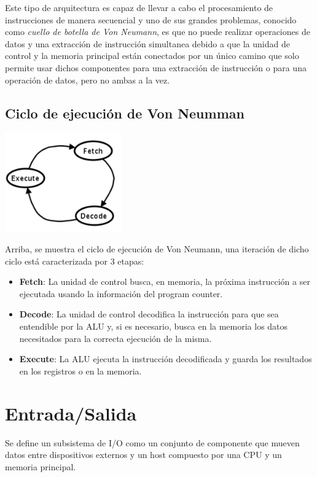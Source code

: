 Este tipo de arquitectura es capaz de llevar a cabo el procesamiento de instrucciones de manera secuencial y uno de sus grandes problemas, conocido como \textit{cuello de botella de Von Neumann}, es que no puede realizar operaciones de datos y una extracción de instrucción simultanea debido a que la unidad de control y la memoria principal están conectados por un único camino que solo permite usar dichos componentes para una extracción de instrucción o para una operación de datos, pero no ambas a la vez.

\subsection{Ciclo de ejecución de Von Neumman}
\begin{center}
	\includegraphics[width=5cm, keepaspectratio=yes]{imagenes/von_neumann_cycle.png}
\end{center}
Arriba, se muestra el ciclo de ejecución de Von Neumann, una iteración de dicho ciclo está caracterizada por 3 etapas:
\begin{itemize}
	\item \textbf{Fetch}: La unidad de control busca, en memoria, la próxima instrucción a ser ejecutada usando la información del program counter.
	\item \textbf{Decode}: La unidad de control decodifica la instrucción para que sea entendible por la ALU y, si es necesario, busca en la memoria los datos necesitados para la correcta ejecución de la misma.
	\item \textbf{Execute}: La ALU ejecuta la instrucción decodificada y guarda los resultados en los registros o en la memoria.
\end{itemize}

\newpage

\section{Entrada/Salida}
Se define un subsistema de I/O como un conjunto de componente que mueven datos entre dispositivos externos y un host compuesto por una CPU y un memoria principal.

